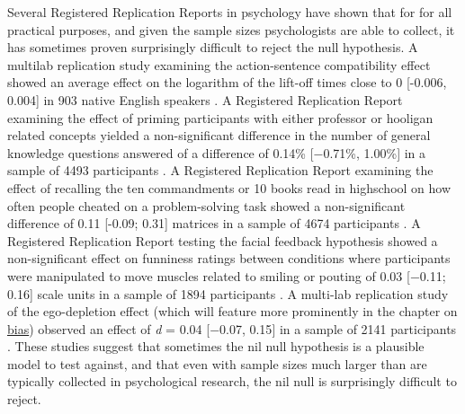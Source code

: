 \documentclass[
  oneside]{krantz}
\begin{document}
Several Registered Replication Reports in psychology have shown that for for all practical purposes, and given the sample sizes psychologists are able to collect, it has sometimes proven surprisingly difficult to reject the null hypothesis. A multilab replication study examining the action-sentence compatibility effect showed an average effect on the logarithm of the lift-off times close to 0 {[}-0.006, 0.004{]} in 903 native English speakers \citep{morey_pre-registered_2021}. A Registered Replication Report examining the effect of priming participants with either professor or hooligan related concepts yielded a non-significant difference in the number of general knowledge questions answered of a difference of 0.14\% {[}−0.71\%, 1.00\%{]} in a sample of 4493 participants \citep{odonnell_registered_2018}. A Registered Replication Report examining the effect of recalling the ten commandments or 10 books read in highschool on how often people cheated on a problem-solving task showed a non-significant difference of 0.11 {[}-0.09; 0.31{]} matrices in a sample of 4674 participants \citep{verschuere_registered_2018}. A Registered Replication Report testing the facial feedback hypothesis showed a non-significant effect on funniness ratings between conditions where participants were manipulated to move muscles related to smiling or pouting of 0.03 {[}−0.11; 0.16{]} scale units in a sample of 1894 participants \citep{wagenmakers_registered_2016}. A multi-lab replication study of the ego-depletion effect (which will feature more prominently in the chapter on \protect\hyperlink{bias}{bias}) observed an effect of \emph{d} = 0.04 {[}−0.07, 0.15{]} in a sample of 2141 participants \citep{hagger_multilab_2016}. These studies suggest that sometimes the nil null hypothesis is a plausible model to test against, and that even with sample sizes much larger than are typically collected in psychological research, the nil null is surprisingly difficult to reject.
\end{document}
